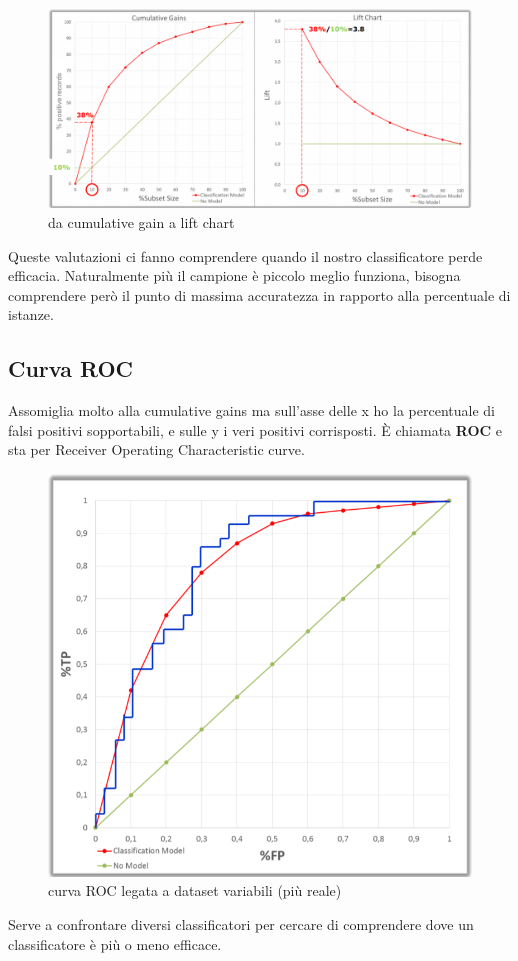 \begin{figure}[h!]
	\centering
	\includegraphics[height=0.45 \linewidth]{classification/pict/lift_chart.png}
	\caption{da cumulative gain a lift chart}
\end{figure}

Queste valutazioni ci fanno comprendere quando il nostro classificatore perde efficacia. Naturalmente pi\`u il campione \`e piccolo meglio funziona, bisogna comprendere per\`o il punto di massima accuratezza in rapporto alla percentuale di istanze.

\subsection{Curva ROC}
Assomiglia molto alla cumulative gains ma sull'asse delle x ho la percentuale di falsi positivi sopportabili, e sulle y i veri positivi corrisposti. \`E chiamata \textbf{ROC} e sta per Receiver Operating Characteristic curve. 
\begin{figure}[h!]
	\centering
	\includegraphics[height=0.6 \linewidth]{classification/pict/roc.png}
	\caption{curva ROC legata a dataset variabili (pi\`u reale)}
\end{figure}
Serve a confrontare diversi classificatori per cercare di comprendere dove un classificatore \`e pi\`u o meno efficace. 

